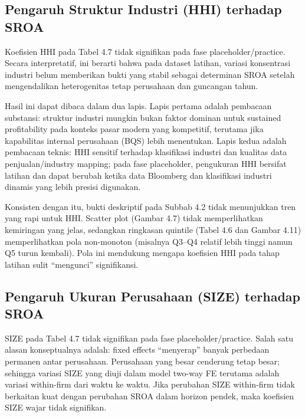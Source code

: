 \documentclass[12pt,a4paper]{report}
\begin{document}
\hypertarget{pengaruh-struktur-industri-hhi-terhadap-sroa}{%
\subsection{Pengaruh Struktur Industri (HHI) terhadap
SROA}\label{pengaruh-struktur-industri-hhi-terhadap-sroa}}

Koefisien HHI pada Tabel 4.7 tidak signifikan pada fase
placeholder/practice. Secara interpretatif, ini berarti bahwa pada
dataset latihan, variasi konsentrasi industri belum memberikan bukti
yang stabil sebagai determinan SROA setelah mengendalikan heterogenitas
tetap perusahaan dan guncangan tahun.

Hasil ini dapat dibaca dalam dua lapis. Lapis pertama adalah pembacaan
substansi: struktur industri mungkin bukan faktor dominan untuk
sustained profitability pada konteks pasar modern yang kompetitif,
terutama jika kapabilitas internal perusahaan (BQS) lebih menentukan.
Lapis kedua adalah pembacaan teknis: HHI sensitif terhadap klasifikasi
industri dan kualitas data penjualan/industry mapping; pada fase
placeholder, pengukuran HHI bersifat latihan dan dapat berubah ketika
data Bloomberg dan klasifikasi industri dinamis yang lebih presisi
digunakan.

Konsisten dengan itu, bukti deskriptif pada Subbab 4.2 tidak menunjukkan
tren yang rapi untuk HHI. Scatter plot (Gambar 4.7) tidak memperlihatkan
kemiringan yang jelas, sedangkan ringkasan quintile (Tabel 4.6 dan
Gambar 4.11) memperlihatkan pola non-monoton (misalnya Q3--Q4 relatif
lebih tinggi namun Q5 turun kembali). Pola ini mendukung mengapa
koefisien HHI pada tahap latihan sulit ``mengunci'' signifikansi.

\hypertarget{pengaruh-ukuran-perusahaan-size-terhadap-sroa}{%
\subsection{Pengaruh Ukuran Perusahaan (SIZE) terhadap
SROA}\label{pengaruh-ukuran-perusahaan-size-terhadap-sroa}}

SIZE pada Tabel 4.7 tidak signifikan pada fase placeholder/practice.
Salah satu alasan konseptualnya adalah: fixed effects ``menyerap''
banyak perbedaan permanen antar perusahaan. Perusahaan yang besar
cenderung tetap besar; sehingga variasi SIZE yang diuji dalam model
two-way FE terutama adalah variasi within-firm dari waktu ke waktu. Jika
perubahan SIZE within-firm tidak berkaitan kuat dengan perubahan SROA
dalam horizon pendek, maka koefisien SIZE wajar tidak signifikan.
\end{document}
